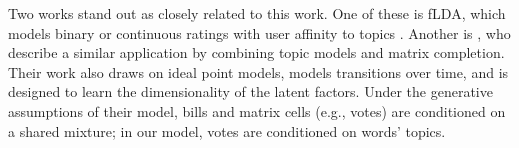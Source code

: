 Two works stand out as closely related to this work.  One of these is
fLDA, which models binary or continuous ratings with user affinity to
topics \citep{agarwal:2010}.  Another is \cite{wang:2010}, who
describe a similar application by combining topic models and matrix
completion.  Their work also draws on ideal point models, models
transitions over time, and is designed to learn the dimensionality of
the latent factors.  Under the generative assumptions of their model,
bills and matrix cells (e.g., votes) are conditioned on a shared
mixture; in our model, votes are conditioned on words' topics.









